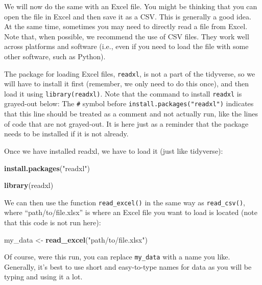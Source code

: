 \documentclass[]{book}
\newenvironment{Shaded}{\begin{snugshade}}{\end{snugshade}}
\newcommand{\KeywordTok}[1]{\textcolor[rgb]{0.13,0.29,0.53}{\textbf{#1}}}
\newcommand{\StringTok}[1]{\textcolor[rgb]{0.31,0.60,0.02}{#1}}
\newcommand{\NormalTok}[1]{#1}
\begin{document}
We will now do the same with an Excel file. You might be thinking that
you can open the file in Excel and then save it as a CSV. This is
generally a good idea. At the same time, sometimes you may need to
directly read a file from Excel. Note that, when possible, we recommend
the use of CSV files. They work well across platforms and software
(i.e., even if you need to load the file with some other software, such
as Python).

The package for loading Excel files, \texttt{readxl}, is not a part of
the tidyverse, so we will have to install it first (remember, we only
need to do this once), and then load it using \texttt{library(readxl)}.
Note that the command to install \texttt{readxl} is grayed-out below:
The \texttt{\#} symbol before \texttt{install.packages("readxl")}
indicates that this line should be treated as a comment and not actually
run, like the lines of code that are not grayed-out. It is here just as
a reminder that the package needs to be installed if it is not already.

Once we have installed readxl, we have to load it (just like tidyverse):

\begin{Shaded}
\begin{Highlighting}[]
\KeywordTok{install.packages}\NormalTok{(}\StringTok{"readxl"}\NormalTok{)}
\end{Highlighting}
\end{Shaded}

\begin{Shaded}
\begin{Highlighting}[]
\KeywordTok{library}\NormalTok{(readxl)}
\end{Highlighting}
\end{Shaded}

We can then use the function \texttt{read\_excel()} in the same way as
\texttt{read\_csv()}, where ``path/to/file.xlsx'' is where an Excel file
you want to load is located (note that this code is not run here):

\begin{Shaded}
\begin{Highlighting}[]
\NormalTok{my_data <-}
\StringTok{    }\KeywordTok{read_excel}\NormalTok{(}\StringTok{"path/to/file.xlsx"}\NormalTok{)}
\end{Highlighting}
\end{Shaded}

Of course, were this run, you can replace \texttt{my\_data} with a name
you like. Generally, it's best to use short and easy-to-type names for
data as you will be typing and using it a lot.
\end{document}
